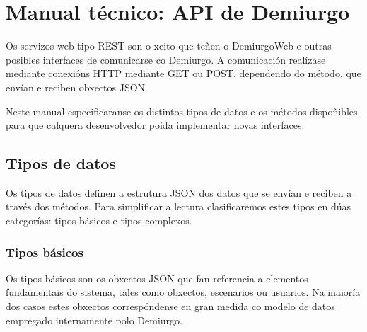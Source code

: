 \chapter{Manual técnico: API de Demiurgo}
\renewcommand\theadfont{\bfseries}
\renewcommand\cellalign{ll}

Os servizos web tipo REST son o xeito que teñen o DemiurgoWeb e outras posibles
interfaces de comunicarse co Demiurgo. A comunicación realízase mediante
conexións HTTP mediante GET ou POST, dependendo do método, que envían e reciben
obxectos JSON.
\par
Neste manual especificaranse os distintos tipos de datos e os métodos
dispoñibles para que calquera desenvolvedor poida implementar novas interfaces.

\section{Tipos de datos}
Os tipos de datos definen a estrutura JSON dos datos que se envían e reciben a
través dos métodos. Para simplificar a lectura clasificaremos estes tipos en
dúas categorías: tipos básicos e tipos complexos.

\subsection{Tipos básicos}
Os tipos básicos son os obxectos JSON que fan referencia a elementos
fundamentais do sistema, tales como obxectos, escenarios ou usuarios. Na maioría
dos casos estes obxectos correspóndense en gran medida co modelo de datos
empregado internamente polo Demiurgo.

